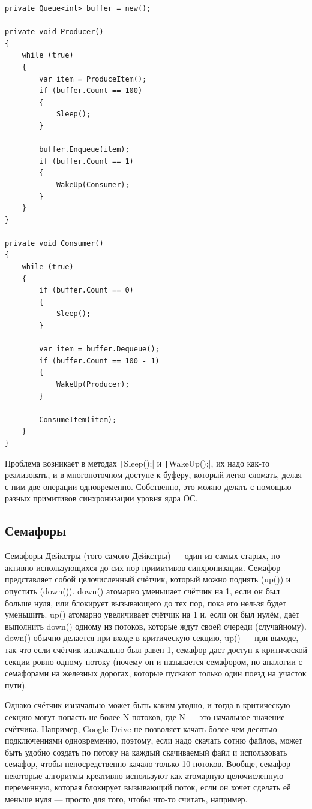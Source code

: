 \documentclass{../../text-style}
\begin{document}
\begin{verbatim}
private Queue<int> buffer = new();

private void Producer()
{
    while (true)
    {
        var item = ProduceItem();
        if (buffer.Count == 100)
        {
            Sleep();
        }

        buffer.Enqueue(item);
        if (buffer.Count == 1)
        {
            WakeUp(Consumer);
        }
    }
}

private void Consumer()
{
    while (true)
    {
        if (buffer.Count == 0)
        {
            Sleep();
        }

        var item = buffer.Dequeue();
        if (buffer.Count == 100 - 1)
        {
            WakeUp(Producer);
        }

        ConsumeItem(item);
    }
}
\end{verbatim}

Проблема возникает в методах \texttt|Sleep();| и \texttt|WakeUp();|, их надо как-то реализовать, и в многопоточном доступе к буферу, который легко сломать, делая с ним две операции одновременно. Собственно, это можно делать с помощью разных примитивов синхронизации уровня ядра ОС.

\subsection{Семафоры}

Семафоры Дейкстры (того самого Дейкстры) --- один из самых старых, но активно использующихся до сих пор примитивов синхронизации. Семафор представляет собой целочисленный счётчик, который можно поднять (up()) и опустить (down()). down() атомарно уменьшает счётчик на 1, если он был больше нуля, или блокирует вызывающего до тех пор, пока его нельзя будет уменьшить. up() атомарно увеличивает счётчик на 1 и, если он был нулём, даёт выполнить down() одному из потоков, которые ждут своей очереди (случайному). down() обычно делается при входе в критическую секцию, up() --- при выходе, так что если счётчик изначально был равен 1, семафор даст доступ к критической секции ровно одному потоку (почему он и называется семафором, по аналогии с семафорами на железных дорогах, которые пускают только один поезд на участок пути). 

Однако счётчик изначально может быть каким угодно, и тогда в критическую секцию могут попасть не более N потоков, где N --- это начальное значение счётчика. Например, Google Drive не позволяет качать более чем десятью подключениями одновременно, поэтому, если надо скачать сотню файлов, может быть удобно создать по потоку на каждый скачиваемый файл и использовать семафор, чтобы непосредственно качало только 10 потоков. Вообще, семафор некоторые алгоритмы креативно используют как атомарную целочисленную переменную, которая блокирует вызывающий поток, если он хочет сделать её меньше нуля --- просто для того, чтобы что-то считать, например.
\end{document}
